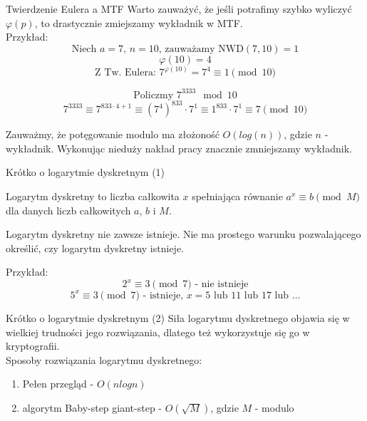 \documentclass[polish,envcountsect,10pt]{beamer}
\begin{document}
\begin{frame}{Twierdzenie Eulera a MTF}
    Warto zauważyć, że jeśli potrafimy szybko wyliczyć $\varphi(p)$, to drastycznie zmiejszamy wykładnik w MTF.
    \\
    
    Przykład:
    \[ \text{Niech } a = 7 \text{, } n=10 \text{, zauważamy NWD}(7, 10) = 1 \]
    \[ \varphi(10) = 4 \]
    \[ \text{Z Tw. Eulera: } 7^{\varphi(10)} = 7^4 \equiv 1 \pmod{10}\]


    \[ \text{Policzmy } {7}^{3333} \mod{10} \]
    \[ 7^{3333} \equiv 7^{833\cdot 4 + 1} \equiv (7^{4})^{833}\cdot{7^{1}} \equiv 1^{833}\cdot{7^{1}} \equiv 7 \pmod{10} \]

    Zauważmy, że potęgowanie modulo ma złożoność $O(log(n))$, gdzie $n$ - wykładnik.
    Wykonując nieduży nakład pracy znacznie zmniejszamy wykładnik.
\end{frame}
%  

\begin{frame}{Krótko o logarytmie dyskretnym (1)}
    \begin{definition}
        Logarytm dyskretny to liczba całkowita $x$ spełniająca równanie $a^x \equiv b \pmod M$ dla danych liczb całkowitych $a$, $b$ i $M$.
    \end{definition}
    
    \begin{definition}
        Logarytm dyskretny nie zawsze istnieje. Nie ma prostego warunku pozwalającego określić, czy logarytm dyskretny istnieje.
    \end{definition}
    

    Przykład:
    \[2^x \equiv 3 \pmod 7 \text{ - nie istnieje} \]
    \[5^x \equiv 3 \pmod 7 \text{ - istnieje, } x = 5 \text{ lub } 11 \text{ lub } 17 \text{ lub } \ldots  \]

\end{frame}


\begin{frame}{Krótko o logarytmie dyskretnym (2)}
    Siła logarytmu dyskretnego objawia się w wielkiej trudności jego rozwiązania, dlatego też wykorzystuje się go w kryptografii.
    \\

    Sposoby rozwiązania logarytmu dyskretnego:
    \begin{enumerate}
        \item Pełen przegląd - $O(nlog{n})$
        \item algorytm Baby-step giant-step - $O(\sqrt{M})$, gdzie $M$ - modulo
    \end{enumerate}

\end{frame}
\end{document}
